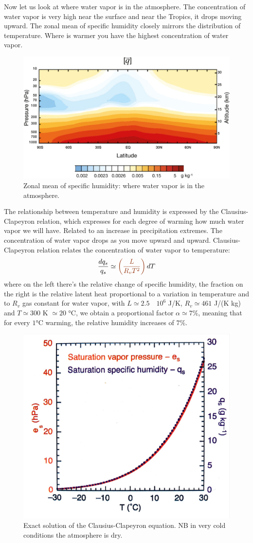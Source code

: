 Now let us look at where water vapor is in the atmosphere. The concentration of water vapor is very high near the surface and near the Tropics, it drops moving upward. The zonal mean of specific humidity closely mirrors the distribution of temperature. Where is warmer you have the highest concentration of water vapor. 
\begin{figure}[h]
    \centering
    \includegraphics[width=0.5\linewidth]{uploads/specific humidity.png}
    \caption{Zonal mean of specific humidity: where water vapor is in the atmosphere.}
    \label{fig:specific humidity}
\end{figure}
The relationship between temperature and humidity is expressed by the Clausius-Clapeyron relation, which expresses for each degree of warming how much water vapor we will have. Related to an increase in precipitation extremes. The concentration of water vapor drops as you move upward and upward. Clausius-Clapeyron relation relates the concentration of water vapor to temperature:
\begin{equation}\label{eq:CC eq}
    \frac{dq_s}{q_s}\simeq \color{RawSienna}\left(\frac{L}{R_vT^2}\right)\color{black}dT
\end{equation}
where on the left there's the relative change of specific humidity, the \textcolor{RawSienna}{fraction} on the right is the relative latent heat proportional to a variation in temperature and to $R_v$ gas constant for water vapor, with $L\simeq 2.5 \quad 10^6$ J/K, $R_v\simeq 461$ J/(K kg) and $T\simeq 300$ K $\simeq 20$ °C, we obtain a proportional factor $\alpha \simeq 7\%$, meaning that for every $1$°C warming, the relative humidity increases of $7\%$.
\begin{figure}[h]
    \centering
    \includegraphics[width=0.5\linewidth]{uploads/exact CC.png}
    \caption{Exact solution of the Clausius-Clapeyron equation. NB in very cold conditions the atmosphere is dry.}
    \label{fig:exact CC}
\end{figure}


